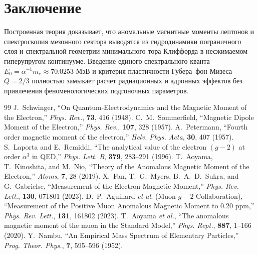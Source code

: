\documentclass[12pt,a4paper]{article}
\begin{document}
	\section{Заключение}
	
	Построенная теория доказывает, что аномальные магнитные моменты лептонов и спектроскопия мезонного сектора выводятся из гидродинамики пограничного слоя и спектральной геометрии минимального тора Клиффорда в несжимаемом гиперупругом континууме. Введение единого спектрального кванта $E_0 = \alpha^{-1} m_e \approx 70.0253$ МэВ и критерия пластичности Губера--фон Мизеса $Q = 2/3$ полностью замыкает расчет радиационных и адронных эффектов без привлечения феноменологических подгоночных параметров.
	
	\begin{thebibliography}{99}
		 J.~Schwinger, ``On Quantum-Electrodynamics and the Magnetic Moment of the Electron,'' \textit{Phys. Rev.}, \textbf{73}, 416 (1948).
		 C.~M.~Sommerfield, ``Magnetic Dipole Moment of the Electron,'' \textit{Phys. Rev.}, \textbf{107}, 328 (1957).
		 A.~Petermann, ``Fourth order magnetic moment of the electron,'' \textit{Helv. Phys. Acta}, \textbf{30}, 407 (1957).
		 S.~Laporta and E.~Remiddi, ``The analytical value of the electron $(g-2)$ at order $\alpha^3$ in QED,'' \textit{Phys. Lett. B}, \textbf{379}, 283--291 (1996).
		 T.~Aoyama, T.~Kinoshita, and M.~Nio, ``Theory of the Anomalous Magnetic Moment of the Electron,'' \textit{Atoms}, \textbf{7}, 28 (2019).
		 X.~Fan, T.~G.~Myers, B.~A.~D.~Sukra, and G.~Gabrielse, ``Measurement of the Electron Magnetic Moment,'' \textit{Phys. Rev. Lett.}, \textbf{130}, 071801 (2023).
		 D.~P.~Aguillard \textit{et al.} (Muon $g-2$ Collaboration), ``Measurement of the Positive Muon Anomalous Magnetic Moment to 0.20 ppm,'' \textit{Phys. Rev. Lett.}, \textbf{131}, 161802 (2023).
		 T.~Aoyama \textit{et al.}, ``The anomalous magnetic moment of the muon in the Standard Model,'' \textit{Phys. Rept.}, \textbf{887}, 1--166 (2020).
		 Y.~Nambu, ``An Empirical Mass Spectrum of Elementary Particles,'' \textit{Prog. Theor. Phys.}, \textbf{7}, 595--596 (1952).
	\end{thebibliography}
	
\end{document}
